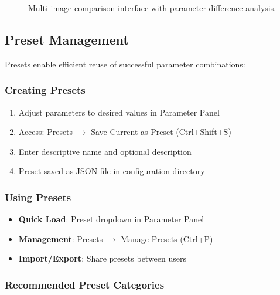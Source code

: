 \documentclass[11pt,a4paper]{article}
\begin{document}
\begin{figure}[H]
\centering
\caption{Multi-image comparison interface with parameter difference
analysis.}
\label{fig:comparison}
\end{figure}

\subsection{Preset Management}

Presets enable efficient reuse of successful parameter combinations:

\subsubsection{Creating Presets}

\begin{enumerate}
\item Adjust parameters to desired values in Parameter Panel
\item Access: Presets $\rightarrow$ Save Current as Preset (Ctrl+Shift+S)
\item Enter descriptive name and optional description
\item Preset saved as JSON file in configuration directory
\end{enumerate}

\subsubsection{Using Presets}

\begin{itemize}[leftmargin=*]
\item \textbf{Quick Load}: Preset dropdown in Parameter Panel
\item \textbf{Management}: Presets $\rightarrow$ Manage Presets (Ctrl+P)
\item \textbf{Import/Export}: Share presets between users
\end{itemize}

\subsubsection{Recommended Preset Categories}
\end{document}
